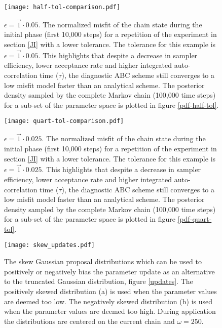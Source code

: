 \begin{figure}[H]
	\centering
	\texttt{[image: half-tol-comparison.pdf]}
	\caption{$\epsilon = \vec{1}\cdot0.05$. The normalized misfit of the chain state during the initial phase (first 10,000 steps) for a repetition of the experiment in section \ref{JI} with a lower tolerance. The tolerance for this example is $\epsilon = \vec{1}\cdot0.05$. This highlights that despite a decrease in sampler efficiency, lower acceptance rate and higher integrated auto-correlation time ($\tau$), the diagnostic ABC scheme still converges to a low misfit model faster than an analytical scheme. The posterior density sampled by the complete Markov chain (100,000 time steps) for a sub-set of the parameter space is plotted in figure \ref{pdf-half-tol}.}
	\label{comparison-half-tol}
\end{figure}

\begin{figure}[H]
	\centering
	\texttt{[image: quart-tol-comparison.pdf]}
	\caption{$\epsilon = \vec{1}\cdot0.025$. The normalized misfit of the chain state during the initial phase (first 10,000 steps) for a repetition of the experiment in section \ref{JI} with a lower tolerance. The tolerance for this example is $\epsilon = \vec{1}\cdot0.025$. This highlights that despite a decrease in sampler efficiency, lower acceptance rate and higher integrated auto-correlation time ($\tau$), the diagnostic ABC scheme still converges to a low misfit model faster than an analytical scheme. The posterior density sampled by the complete Markov chain (100,000 time steps) for a sub-set of the parameter space is plotted in figure \ref{pdf-quart-tol}.}
	\label{comparison-quart-tol}
\end{figure}

\begin{figure}[H]
	\centering
	\texttt{[image: skew\_updates.pdf]}
	\caption{The skew Gaussian proposal distributions which can be used to positively or negatively bias the parameter update as an alternative to the truncated Gaussian distribution, figure \ref{updates}. The positively skewed distribution (a) is used when the parameter values are deemed too low. The negatively skewed distribution (b) is used when the parameter values are deemed too high. During application the distributions are centered on the current chain and $\omega = 250$.}
	\label{skew-updates}
\end{figure}

